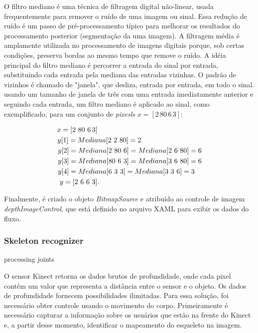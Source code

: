O filtro mediano é uma técnica de filtragem digital não-linear, usada frequentemente para remover o ruído de uma imagem ou sinal. Essa redução de ruído é um passo de pré-processamento típico para melhorar os resultados do processamento posterior (segmentação da uma imagem). A filtragem média é amplamente utilizada no processamento de imagens digitais porque, sob certas condições, preserva bordas ao mesmo tempo que remove o ruído. A idéia principal do filtro mediano é percorrer a entrada do sinal por entrada, substituindo cada entrada pela mediana das entradas vizinhas. O padrão de vizinhos é chamado de "janela", que desliza, entrada por entrada, em todo o sinal. usando um tamanho de janela de três com uma entrada imediatamente anterior e seguindo cada entrada, um filtro mediano é aplicado ao  sinal, como exemplificado, para um conjunto de \textit{pixesls} $x = [2\,80\, 6 \,3]$:

\begin{align*}
x = [2\,\, 80\,\, 6 \,3]\MoveEqLeft[23]\\
y[1] = Mediana[2\,\, 2\,\, 80] = 2\MoveEqLeft[16.7]\\
y[2] = Mediana[2\,\, 80\,\, 6] = Mediana[2\,\, 6\,\, 80] = 6\MoveEqLeft[8]\\
y[3] = Mediana[80\,\, 6\,\, 3] = Mediana[3\,\, 6\,\, 80] = 6\MoveEqLeft[8]\\
y[4] = Mediana[6\,\, 3\,\, 3] = Mediana[3\,\, 3\,\, 6] = 3\MoveEqLeft[9]\\
y = [2\,\, 6\,\, 6\,\, 3]\MoveEqLeft[23].
\end{align*}

Finalmente, é criado o objeto \textit{BitmapSource} e atribuído ao controle de imagem \textit{depthImageControl}, que está definido no arquivo XAML para exibir os dados do fluxo.


\subsubsection{Skeleton recognizer }\label{sec:skeleton}
processing joints

O sensor Kinect retorna os dados brutos de profundidade, onde cada pixel contém um valor que representa a distância entre o sensor e o objeto. Os dados de profundidade fornecem possibilidades ilimitadas. Para essa solução, foi necessário obter controle usando o movimento do corpo. Primeiramente é necessário capturar a informação sobre os usuários que estão na frente do Kinect e, a partir desse momento, identificar o mapeamento do esqueleto na imagem.

